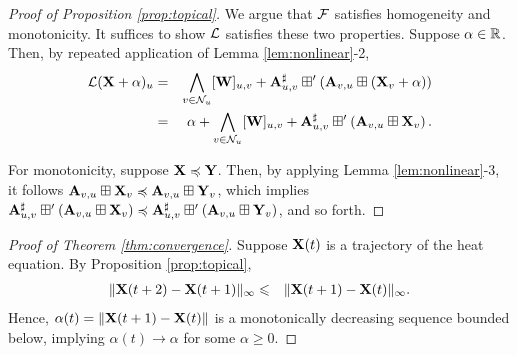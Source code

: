\documentclass[letterpaper, 10 pt, conference]{ieeeconf}
\begin{document}
\begin{proof}[Proof of Proposition \ref{prop:topical}]
    We argue that $\mathcal{F}$ satisfies homogeneity and monotonicity. It suffices to show $\mathcal{L}$ satisfies these two properties. Suppose $\alpha \in \mathbb{R}$. Then, by repeated application of Lemma \ref{lem:nonlinear}-2,
    \begin{align*}
        \mathcal{L}(\mathbf{X} + \alpha)_u &=& \bigwedge_{v \in \mathcal{N}_u} [\mathbf{W}]_{u,v} + {\mathbf{A}}^{\sharp}_{u,v} \boxplus' \left( \mathbf{A}_{v,u} \boxplus \left( \mathbf{X}_v + \alpha \right) \right) \\
        &=& \alpha + \bigwedge_{v \in \mathcal{N}_u} [\mathbf{W}]_{u,v} + {\mathbf{A}}^{\sharp}_{u,v} \boxplus' \left( \mathbf{A}_{v,u} \boxplus \mathbf{X}_v \right).
    \end{align*}

    For monotonicity, suppose $\mathbf{X} \preccurlyeq \mathbf{Y}$. Then, by applying Lemma \ref{lem:nonlinear}-3, it follows $\mathbf{A}_{v,u} \boxplus \mathbf{X}_v \preccurlyeq \mathbf{A}_{v,u} \boxplus \mathbf{Y}_v$, which implies ${\mathbf{A}}^{\sharp}_{u,v} \boxplus' \left( \mathbf{A}_{v,u} \boxplus \mathbf{X}_v \right) \preccurlyeq {\mathbf{A}}^{\sharp}_{u,v} \boxplus' \left(\mathbf{A}_{v,u} \boxplus \mathbf{Y}_v \right)$, and so forth.
\end{proof}

\begin{proof}[Proof of Theorem \ref{thm:convergence}]
    Suppose $\mathbf{X}(t)$ is a trajectory of the heat equation. By Proposition \ref{prop:topical},
    \begin{align*}
        \| \mathbf{X}(t+2) - \mathbf{X}(t+1) \|_{\infty} &\leqslant& \| \mathbf{X}(t+1) - \mathbf{X}(t) \|_{\infty}.
    \end{align*}
    Hence, $\alpha(t) = \|\mathbf{X}(t+1) - \mathbf{X}(t)\|$ is a monotonically decreasing sequence bounded below, implying $\alpha(t) \to \alpha$ for some $\alpha \geq 0$.
\end{proof}
\end{document}
